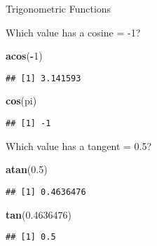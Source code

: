 \documentclass[ignorenonframetext,]{beamer}
\newenvironment{Shaded}{\begin{snugshade}}{\end{snugshade}}
\newcommand{\DecValTok}[1]{\textcolor[rgb]{0.00,0.00,0.81}{#1}}
\newcommand{\FloatTok}[1]{\textcolor[rgb]{0.00,0.00,0.81}{#1}}
\newcommand{\KeywordTok}[1]{\textcolor[rgb]{0.13,0.29,0.53}{\textbf{#1}}}
\newcommand{\NormalTok}[1]{#1}
\newcommand{\OperatorTok}[1]{\textcolor[rgb]{0.81,0.36,0.00}{\textbf{#1}}}
\begin{document}
\begin{frame}[fragile]{Trigonometric Functions}
\protect\hypertarget{trigonometric-functions-1}{}

Which value has a cosine = -1?

\begin{Shaded}
\begin{Highlighting}[]
\KeywordTok{acos}\NormalTok{(}\OperatorTok{-}\DecValTok{1}\NormalTok{)}
\end{Highlighting}
\end{Shaded}

\begin{verbatim}
## [1] 3.141593
\end{verbatim}

\begin{Shaded}
\begin{Highlighting}[]
\KeywordTok{cos}\NormalTok{(pi)}
\end{Highlighting}
\end{Shaded}

\begin{verbatim}
## [1] -1
\end{verbatim}

Which value has a tangent = 0.5?

\begin{Shaded}
\begin{Highlighting}[]
\KeywordTok{atan}\NormalTok{(}\FloatTok{0.5}\NormalTok{)}
\end{Highlighting}
\end{Shaded}

\begin{verbatim}
## [1] 0.4636476
\end{verbatim}

\begin{Shaded}
\begin{Highlighting}[]
\KeywordTok{tan}\NormalTok{(}\FloatTok{0.4636476}\NormalTok{)}
\end{Highlighting}
\end{Shaded}

\begin{verbatim}
## [1] 0.5
\end{verbatim}

\end{frame}
\end{document}
